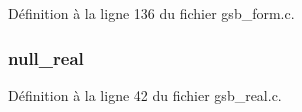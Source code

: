 Définition à la ligne 136 du fichier gsb\_\-form.c.

\subsubsection[{null\_\-real}]{ {\bf null\_\-real}}\label{gsb__form__transaction_8c_a26f304bec3fdc0651b9aa8765d4de3c6}


Définition à la ligne 42 du fichier gsb\_\-real.c.

